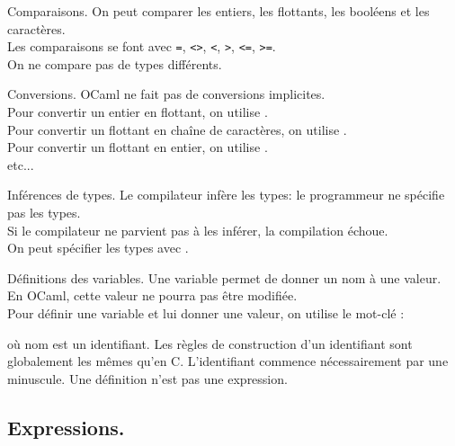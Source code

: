 \documentclass[french, 11pt]{article}
\begin{document}
\begin{defi}{Comparaisons.}{}
    On peut comparer les entiers, les flottants, les booléens et les caractères.\\
    Les comparaisons se font avec \texttt{=}, \texttt{<>}, \texttt{<}, \texttt{>}, \texttt{<=}, \texttt{>=}.\\
    On ne compare pas de types différents.
\end{defi}

\begin{defi}{Conversions.}{}
    OCaml ne fait pas de conversions implicites.\\
    Pour convertir un entier en flottant, on utilise .\\
    Pour convertir un flottant en chaîne de caractères, on utilise .\\
    Pour convertir un flottant en entier, on utilise .\\
    etc...
\end{defi}

\begin{defi}{Inférences de types.}{}
    Le compilateur infère les types: le programmeur ne spécifie pas les types.\\
    Si le compilateur ne parvient pas à les inférer, la compilation échoue.\\
    On peut spécifier les types avec .
\end{defi}

\begin{defi}{Définitions des variables.}{}
    Une variable permet de donner un nom à une valeur. En OCaml, cette valeur ne pourra pas être modifiée.\\
    Pour définir une variable et lui donner une valeur, on utilise le mot-clé :
    \begin{center}
    \end{center}
    où nom est un identifiant. Les règles de construction d'un identifiant sont globalement les mêmes qu'en C. L'identifiant commence nécessairement par une minuscule.\n
    Une définition n'est pas une expression. 
\end{defi}

\subsection{Expressions.}
\end{document}
